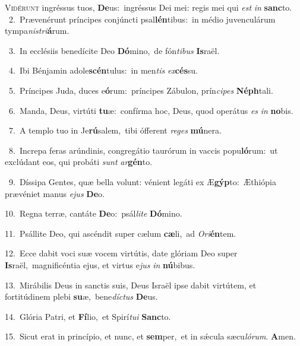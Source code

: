 \lettrine{\initial\textcolor{\initialcolor}{V}}{idérunt} ingréssus tuos, \textbf{De}\-us:~\star ingréssus Dei mei: regis mei qui \textit{est} \textit{in} \textbf{sanc}\-to.\\
{\numbfont\textcolor{\numbcolor}{~2.}}~Prævenérunt príncipes conjúncti psal\-\textbf{lén}\-tibus:~\star in médio juvenculárum tympa\-\textit{nis}\-\textit{tri}\textbf{á}rum.\par
{\numbfont\textcolor{\numbcolor}{~3.}}~In ecclésiis benedícite Deo \textbf{Dó}\-mino,~\star de fón\-\textit{ti}\-\textit{bus} \textbf{Is}\-raël.\par
{\numbfont\textcolor{\numbcolor}{~4.}}~Ibi Bénjamin adole\-\textbf{scén}\-tulus:~\star in men\textit{tis} \textit{ex}\-\textbf{cés}su.\par
{\numbfont\textcolor{\numbcolor}{~5.}}~Príncipes Juda, duces e\-\textbf{ó}\-rum:~\star príncipes Zábulon, prín\-\textit{ci}\-\textit{pes} \textbf{Néph}\-tali.\par
{\numbfont\textcolor{\numbcolor}{~6.}}~Manda, Deus, virtúti \textbf{tu}\-æ:~\star confírma hoc, Deus, quod operátus \textit{es} \textit{in} \textbf{no}\-bis.\par
{\numbfont\textcolor{\numbcolor}{~7.}}~A templo tuo in Je\-\textbf{rú}\-salem,~\star tibi ófferent \textit{re}\-\textit{ges} \textbf{mú}\-nera.\par
{\numbfont\textcolor{\numbcolor}{~8.}}~Increpa feras arúndinis, congregátio taurórum in vaccis popu\-\textbf{ló}\-rum:~\star ut exclúdant eos, qui probáti \textit{sunt} \textit{ar}\-\textbf{gén}to.\par
{\numbfont\textcolor{\numbcolor}{~9.}}~Díssipa Gentes, quæ bella volunt: vénient legáti ex Æ\-\textbf{gýp}\-to:~\star Æthiópia prævéniet manus \textit{e}\-\textit{jus} \textbf{De}\-o.\par
{\numbfont\textcolor{\numbcolor}{10.}}~Regna terræ, cantáte \textbf{De}\-o:~\star psál\-\textit{li}\-\textit{te} \textbf{Dó}\-mino.\par
{\numbfont\textcolor{\numbcolor}{11.}}~Psállite Deo, qui ascéndit super cælum \textbf{cæ}\-li,~\star ad \textit{O}\-\textit{ri}\textbf{én}tem.\par
{\numbfont\textcolor{\numbcolor}{12.}}~Ecce dabit voci suæ vocem virtútis, date glóriam Deo super \textbf{Is}\-raël,~\star magnificéntia ejus, et virtus e\textit{jus} \textit{in} \textbf{nú}\-bibus.\par
{\numbfont\textcolor{\numbcolor}{13.}}~Mirábilis Deus in sanctis suis, Deus Israël ipse dabit virtútem, et fortitúdinem plebi \textbf{su}\-æ,~\star bene\-\textit{díc}\-\textit{tus} \textbf{De}\-us.\par
{\numbfont\textcolor{\numbcolor}{14.}}~Glória Patri, et \textbf{Fí}\-lio,~\star et Spirí\-\textit{tu}\-\textit{i} \textbf{Sanc}\-to.\par
{\numbfont\textcolor{\numbcolor}{15.}}~Sicut erat in princípio, et nunc, et \textbf{sem}\-per,~\star et in sǽcula sæcu\-\textit{ló}\-\textit{rum}. \textbf{A}\-men.\par
